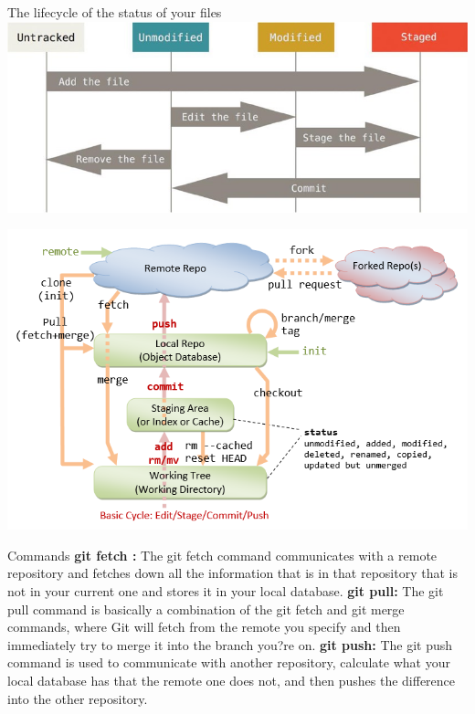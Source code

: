 \documentclass[xcolor=x11names,compress]{beamer}
\renewcommand{\(}{\begin{columns}}
\renewcommand{\)}{\end{columns}}
\newcommand{\<}[1]{\begin{column}{#1}}
\renewcommand{\>}{\end{column}}
\begin{document}
\begin{frame}{The lifecycle of the status of your files}
	\includegraphics[width = \textwidth,height = 0.5\textheight]{s9.png}
\end{frame}
\begin{frame}
	\includegraphics[width = \textwidth,height = 0.7\textheight]{s11.png}
\end{frame}
\begin{frame}{Commands}
		\textbf{git fetch :}
		The git fetch command communicates with a remote repository and fetches down all the information that is in that
		repository that is not in your current one and stores it in your local database.\newline
		\textbf{git pull:}
		The git pull command is basically a combination of the git fetch and git merge commands, where Git will fetch
		from the remote you specify and then immediately try to merge it into the branch you?re on.\newline
		\textbf{git push:}
		The git push command is used to communicate with another repository, calculate what your local database has
		that the remote one does not, and then pushes the difference into the other repository.\end{frame}
	
\end{document}
